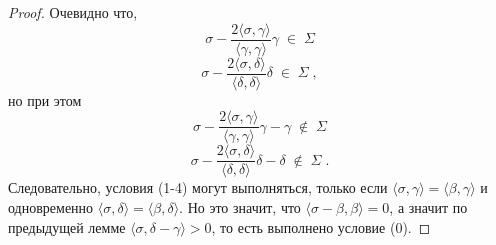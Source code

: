 \documentclass[10pt]{article}
\theoremstyle{remark}
\begin{document}
\begin{proof}
Очевидно что,
$$ \sigma - \frac{2 \langle \sigma,\gamma\rangle}{\langle \gamma , \gamma \rangle}\gamma \;\in\; \Sigma $$
$$ \sigma - \frac{2 \langle \sigma,\delta\rangle}{\langle \delta , \delta \rangle}\delta \;\in\; \Sigma \; , $$
но при этом
$$ \sigma - \frac{2 \langle \sigma,\gamma\rangle}{\langle \gamma , \gamma \rangle}\gamma-\gamma \;\notin\; \Sigma $$
$$ \sigma - \frac{2 \langle \sigma,\delta\rangle}{\langle \delta , \delta \rangle}\delta-\delta \;\notin\; \Sigma \; . $$
Следовательно, условия (1-4) могут выполняться, только если $\langle\sigma,\gamma\rangle=\langle\beta,\gamma\rangle$
и одновременно $\langle\sigma,\delta\rangle=\langle\beta,\delta\rangle$. Но это значит, что $\langle\sigma-\beta,\beta\rangle=0$,
а значит по предыдущей лемме $\langle\sigma,\delta-\gamma\rangle > 0$, то есть выполнено условие (0).
\end{proof}
\end{document}

